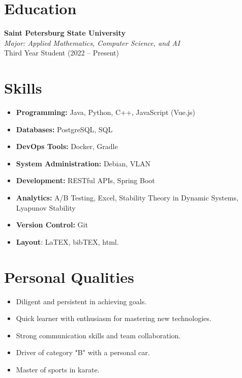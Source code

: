 \documentclass[a4paper,10pt]{article}
\begin{document}
\vspace{0.5cm}

\section*{Education}

\textbf{Saint Petersburg State University} \\
\textit{Major: Applied Mathematics, Computer Science, and AI} \\
Third Year Student (2022 – Present)

\vspace{0.5cm}

\section*{Skills}

\begin{itemize}
    \item \textbf{Programming:} Java, Python, C++, JavaScript (Vue.js)
    \item \textbf{Databases:} PostgreSQL, SQL
    \item \textbf{DevOps Tools:} Docker, Gradle
    \item \textbf{System Administration:} Debian, VLAN
    \item \textbf{Development:} RESTful APIs, Spring Boot
    \item \textbf{Analytics:} A/B Testing, Excel, Stability Theory in Dynamic Systems, Lyapunov Stability
    \item \textbf{Version Control:} Git
    \item \textbf{Layout}: LaTEX, bibTEX, html.
\end{itemize}

\vspace{0.5cm}

\section*{Personal Qualities}

\begin{itemize}
    \item Diligent and persistent in achieving goals.
    \item Quick learner with enthusiasm for mastering new technologies.
    \item Strong communication skills and team collaboration.
    \item Driver of category "B" with a personal car.
    \item Master of sports in karate.
\end{itemize}
\end{document}
